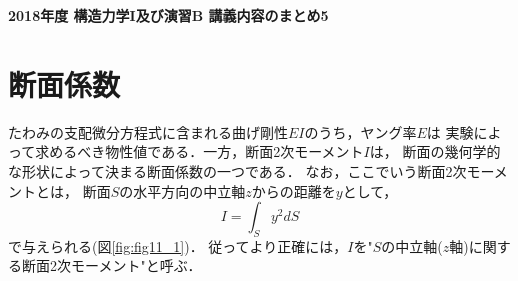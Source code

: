 \documentclass[10pt,a4j]{jarticle}
\newlength{\minitwocolumn}
\begin{document}
\newcommand{\fat}[1]{\mbox{\boldmath $#1$}}
\newcommand{\D}{\partial}
\newcommand{\w}{\omega}
\newcommand{\ga}{\alpha}
\newcommand{\gb}{\beta}
\newcommand{\gx}{\xi}
\newcommand{\gz}{\zeta}
\newcommand{\vhat}[1]{\hat{\fat{#1}}}
\newcommand{\spc}{\vspace{0.7\baselineskip}}
\newcommand{\halfspc}{\vspace{0.3\baselineskip}}

\newcommand{\twofig}[2]
 {
   \begin{figure}
     \begin{minipage}[t]{\minitwocolumn}
         \begin{center}   #1
         \end{center}
     \end{minipage}
         \hspace{\columnsep}
     \begin{minipage}[t]{\minitwocolumn}
         \begin{center} #2
         \end{center}
     \end{minipage}
   \end{figure}
 }
\begin{center}
	{\Large \bf 2018年度 構造力学I及び演習B 講義内容のまとめ5} \\
\end{center}
\section{断面係数}
たわみの支配微分方程式に含まれる曲げ剛性$EI$のうち，ヤング率$E$は
実験によって求めるべき物性値である．一方，断面2次モーメント$I$は，
断面の幾何学的な形状によって決まる断面係数の一つである．
なお，ここでいう断面2次モーメントとは，
断面$S$の水平方向の中立軸$z$からの距離を$y$として，
\begin{equation}
	I=\int_S y^2 dS
	\label{eqn:Iz_xy}
\end{equation}
で与えられる(図\ref{fig:fig11_1})．
従ってより正確には，$I$を"$S$の中立軸($z$軸)に関する断面2次モーメント"と呼ぶ．
\end{document}
